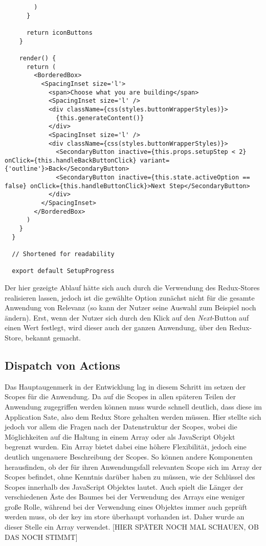 \begin{lstlisting}
        )
      }

      return iconButtons
    }

    render() {
      return (
        <BorderedBox>
          <SpacingInset size='l'>
            <span>Choose what you are building</span>
            <SpacingInset size='l' />
            <div className={css(styles.buttonWrapperStyles)}>
              {this.generateContent()}
            </div>
            <SpacingInset size='l' />
            <div className={css(styles.buttonWrapperStyles)}>
              <SecondaryButton inactive={this.props.setupStep < 2} onClick={this.handleBackButtonClick} variant={'outline'}>Back</SecondaryButton>
              <SecondaryButton inactive={this.state.activeOption == false} onClick={this.handleButtonClick}>Next Step</SecondaryButton>
            </div>
          </SpacingInset>
        </BorderedBox>
      )
    }
  }

  // Shortened for readability

  export default SetupProgress
\end{lstlisting}

Der hier gezeigte Ablauf hätte sich auch durch die Verwendung des Redux-Stores realisieren lassen, jedoch ist die gewählte Option zunächst nicht für die gesamte Anwendung von Relevanz (so kann der Nutzer seine Auswahl zum Beispiel noch ändern). Erst, wenn der Nutzer sich durch den Klick auf den \textit{Next}-Button auf einen Wert festlegt, wird dieser auch der ganzen Anwendung, über den Redux-Store, bekannt gemacht.

\subsection{Dispatch von Actions}
Das Hauptaugenmerk in der Entwicklung lag in diesem Schritt im setzen der Scopes für die Anwendung. Da auf die Scopes in allen späteren Teilen der Anwendung zugegriffen werden können muss wurde schnell deutlich, dass diese im Application Sate, also dem Redux Store gehalten werden müssen. Hier stellte sich jedoch vor allem die Fragen nach der Datenstruktur der Scopes, wobei die Möglichkeiten auf die Haltung in einem Array oder als JavaScript Objekt begrenzt wurden.
Ein Array bietet dabei eine höhere Flexibilität, jedoch eine deutlich ungenauere Beschreibung der Scopes. So können andere Komponenten herausfinden, ob der für ihren Anwendungsfall relevanten Scope sich im Array der Scopes befindet, ohne Kenntnis darüber haben zu müssen, wie der Schlüssel des Scopes innerhalb des JavaScript Objektes lautet. Auch spielt die Länger der verschiedenen Äste des Baumes bei der Verwendung des Arrays eine weniger große Rolle, während bei der Verwendung eines Objektes immer auch geprüft werden muss, ob der key im store überhaupt vorhanden ist. Daher wurde an dieser Stelle ein Array verwendet.
[HIER SPÄTER NOCH MAL SCHAUEN, OB DAS NOCH STIMMT]

